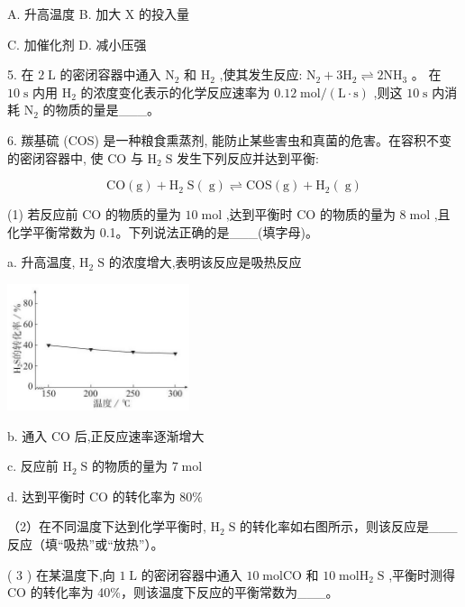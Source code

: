 \documentclass[10pt]{article}
\begin{document}
A. 升高温度 B. 加大 \(\mathrm{X}\) 的投入量

C. 加催化剂 D. 减小压强

5. 在 \(2\mathrm{\;L}\) 的密闭容器中通入 \({\mathrm{N}}_{2}\) 和 \({\mathrm{H}}_{2}\) ,使其发生反应: \({\mathrm{N}}_{2} + 3{\mathrm{H}}_{2} \rightleftharpoons 2{\mathrm{{NH}}}_{3}\) 。 在 \({10}\mathrm{\;s}\) 内用 \({\mathrm{H}}_{2}\) 的浓度变化表示的化学反应速率为 \({0.12}\mathrm{\;{mol}}/\left( {\mathrm{L} \cdot \mathrm{s}}\right)\) ,则这 \({10}\mathrm{\;s}\) 内消耗 \({\mathrm{N}}_{2}\) 的物质的量是\_\_\_。

6. 羰基硫 (COS) 是一种粮食熏蒸剂, 能防止某些害虫和真菌的危害。在容积不变的密闭容器中, 使 \(\mathrm{{CO}}\) 与 \({\mathrm{H}}_{2}\mathrm{\;S}\) 发生下列反应并达到平衡:

\[
\mathrm{{CO}}\left( \mathrm{g}\right) + {\mathrm{H}}_{2}\mathrm{\;S}\left( \mathrm{\;g}\right) \rightleftharpoons \mathrm{{COS}}\left( \mathrm{g}\right) + {\mathrm{H}}_{2}\left( \mathrm{\;g}\right)
\]

(1) 若反应前 \(\mathrm{{CO}}\) 的物质的量为 \({10}\mathrm{\;{mol}}\) ,达到平衡时 \(\mathrm{{CO}}\) 的物质的量为 \(8\mathrm{\;{mol}}\) ,且化学平衡常数为 0.1。下列说法正确的是\_\_\_(填字母)。

a. 升高温度, \({\mathrm{H}}_{2}\mathrm{\;S}\) 的浓度增大,表明该反应是吸热反应

\begin{center}
\includegraphics[max width=0.4\textwidth]{images/0190da9d-8bfd-732f-bc2c-0b21d0f13b91_58_739796.jpg}
\end{center}

b. 通入 \(\mathrm{{CO}}\) 后,正反应速率逐渐增大

c. 反应前 \({\mathrm{H}}_{2}\mathrm{\;S}\) 的物质的量为 \(7\mathrm{\;{mol}}\)

d. 达到平衡时 \(\mathrm{{CO}}\) 的转化率为 \({80}\%\)

（2）在不同温度下达到化学平衡时, \({\mathrm{H}}_{2}\mathrm{\;S}\) 的转化率如右图所示，则该反应是\_\_\_反应（填“吸热”或“放热”）。

( 3 ) 在某温度下,向 \(1\mathrm{\;L}\) 的密闭容器中通入 \({10}\mathrm{\;{mol}}\mathrm{{CO}}\) 和 \({10}\mathrm{\;{mol}}{\mathrm{H}}_{2}\mathrm{\;S}\) ,平衡时测得 \(\mathrm{{CO}}\) 的转化率为 40\%，则该温度下反应的平衡常数为\_\_\_。
\end{document}
